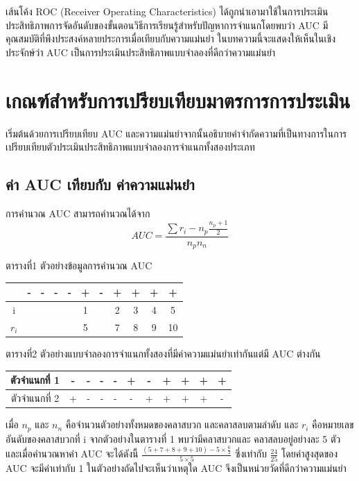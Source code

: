 \documentclass[twoside, twocolumn, 12pt]{article}
\begin{document}
เส้นโค้ง ROC (Receiver Operating Characteristics) ได้ถูกนำเอามาใช้ในการประเมินประสิทธิภาพการจัดอันดับของขั้นตอนวิธีการเรียนรู้สำหรับปัญหาการจำแนกโดยพบว่า AUC มีคุณสมบัติที่พึงประสงค์หลายประการเมื่อเทียบกับความแม่นยำ 
ในบทความนี้จะแสดงให้เห็นในเชิงประจักษ์ว่า AUC เป็นการประเมินประสิทธิภาพแบบจำลองที่ดีกว่าความแม่นยำ

\section{เกณฑ์สำหรับการเปรียบเทียบมาตรการการประเมิน}
\quad เริ่มต้นด้วยการเปรียบเทียบ AUC และความแม่นยำจากนั้นอธิบายคำจำกัดความที่เป็นทางการในการเปรียบเทียบตัวประเมินประสิทธิภาพแบบจำลองการจำแนกทั้งสองประเภท
\subsection{ค่า AUC เทียบกับ ค่าความแม่นยำ}
\quad การคำนวณ AUC สามารถคำนวณได้จาก
\begin{equation}
AUC = \frac{\sum r_i-n_p\frac{n_p + 1}{2}}{n_pn_n}
\end{equation}
\begin{center} ตารางที่1 ตัวอย่างข้อมูลการคำนวณ AUC \end{center}
\begin{center}
\begin{tabular}{ccccccccccc}
  &-&-&-&-&+&-&+&+&+&+ \\
  \hline
  i&&&&&1&&2&3&4&5 \\
  $r_i$& & & & & 5&&7&8&9&10\\
  \hline  
\end{tabular}
\end{center}
\begin{center} ตารางที่2 ตัวอย่างแบบจำลองการจำแนกทั้งสองที่มีค่าความแม่นยำเท่ากันแต่มี AUC ต่างกัน \end{center}
\begin{center}
\begin{tabular}{c|ccccc|ccccc}
  \hline
  ตัวจำแนกที่ 1 &-& -& -& -& +& -& +& +& +& +\\
  \hline
  ตัวจำแนกที่ 2 & +& -& -& -& -& +& +& +& +& -\\
  \hline  
\end{tabular}
\end{center}

เมื่อ $n_p$ และ $n_n$ คือจำนวนตัวอย่างทั้งหมดของคลาสบวก และคลาสลบตามลำดับ และ $r_i$ คือหมายเลขอันดับของคลาสบวกที่ i จากตัวอย่างในตารางที่ 1 พบว่ามีคลาสบวกและ คลาสลบอยู่อย่างละ 5 ตัว และเมื่อคำนวณหาค่า AUC จะได้ดังนี้ $\frac{(5+7+8+9+10)- 5\times\frac{6}{2}}{5\times5}$ ซึ่งเท่ากับ $\frac{24}{25}$ โดยค่าสูงสุดของ AUC จะมีค่าเท่ากับ 1 ในตัวอย่างถัดไปจะเห็นว่าเหตุใด AUC จึงเป็นหน่วยวัดที่ดีกว่าความแม่นยำ
\end{document}
